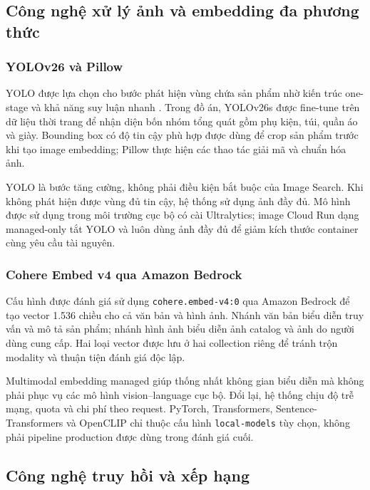\subsection{Công nghệ xử lý ảnh và embedding đa phương thức}

\subsubsection{YOLOv26 và Pillow}

YOLO được lựa chọn cho bước phát hiện vùng chứa sản phẩm nhờ kiến trúc one-stage và khả năng suy luận nhanh \parencite{redmon2016yolo}. Trong đồ án, YOLOv26s được fine-tune trên dữ liệu thời trang để nhận diện bốn nhóm tổng quát gồm phụ kiện, túi, quần áo và giày. Bounding box có độ tin cậy phù hợp được dùng để crop sản phẩm trước khi tạo image embedding; Pillow thực hiện các thao tác giải mã và chuẩn hóa ảnh.

YOLO là bước tăng cường, không phải điều kiện bắt buộc của Image Search. Khi không phát hiện được vùng đủ tin cậy, hệ thống sử dụng ảnh đầy đủ. Mô hình được sử dụng trong môi trường cục bộ có cài Ultralytics; image Cloud Run dạng managed-only tắt YOLO và luôn dùng ảnh đầy đủ để giảm kích thước container cùng yêu cầu tài nguyên.

\subsubsection{Cohere Embed v4 qua Amazon Bedrock}

Cấu hình được đánh giá sử dụng \texttt{cohere.embed-v4:0} qua Amazon Bedrock để tạo vector 1.536 chiều cho cả văn bản và hình ảnh. Nhánh văn bản biểu diễn truy vấn và mô tả sản phẩm; nhánh hình ảnh biểu diễn ảnh catalog và ảnh do người dùng cung cấp. Hai loại vector được lưu ở hai collection riêng để tránh trộn modality và thuận tiện đánh giá độc lập.

Multimodal embedding managed giúp thống nhất không gian biểu diễn mà không phải phục vụ các mô hình vision--language cục bộ. Đổi lại, hệ thống chịu độ trễ mạng, quota và chi phí theo request. PyTorch, Transformers, Sentence-Transformers và OpenCLIP chỉ thuộc cấu hình \texttt{local-models} tùy chọn, không phải pipeline production được dùng trong đánh giá cuối.

\subsection{Công nghệ truy hồi và xếp hạng}

